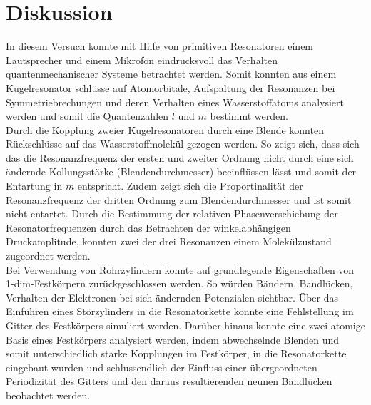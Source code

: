 \section{Diskussion}
In diesem Versuch konnte mit Hilfe von primitiven Resonatoren einem Lautsprecher und
einem Mikrofon eindrucksvoll das Verhalten quantenmechanischer Systeme betrachtet werden.
Somit konnten aus einem Kugelresonator schlüsse auf Atomorbitale, Aufspaltung der Resonanzen bei Symmetriebrechungen und deren Verhalten eines
Wasserstoffatoms analysiert werden und somit die Quantenzahlen $l$ und $m$ bestimmt werden.\\
Durch die Kopplung zweier Kugelresonatoren durch eine Blende konnten Rückschlüsse auf das Wasserstoffmolekül gezogen werden.
So zeigt sich, dass sich das die Resonanzfrequenz der ersten und zweiter Ordnung nicht durch eine sich ändernde Kollungsstärke (Blendendurchmesser)
beeinflüssen lässt und somit der Entartung in $m$ entspricht. Zudem zeigt sich die Proportinalität
der Resonanzfrequenz der dritten Ordnung zum Blendendurchmesser und ist somit nicht entartet.
Durch die Bestimmung der relativen Phasenverschiebung der Resonatorfrequenzen durch das Betrachten der winkelabhängigen Druckamplitude, konnten zwei der drei Resonanzen
einem Molekülzustand zugeordnet werden.\\
Bei Verwendung von Rohrzylindern konnte auf grundlegende Eigenschaften von 1-dim-Festkörpern zurückgeschlossen werden. So würden Bändern, Bandlücken,
Verhalten der Elektronen bei sich ändernden Potenzialen sichtbar. Über das Einführen eines Störzylinders
in die Resonatorkette konnte eine Fehlstellung im Gitter des Festkörpers simuliert werden. Darüber hinaus konnte
eine zwei-atomige Basis eines Festkörpers analysiert werden, indem abwechselnde Blenden und somit unterschiedlich starke Kopplungen im Festkörper,
in die Resonatorkette eingebaut wurden und schlussendlich der Einfluss einer übergeordneten Periodizität
des Gitters und den daraus resultierenden neunen Bandlücken beobachtet werden.
\label{sec:Diskussion}